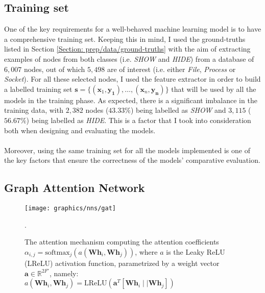 	\subsection{Training set} \label{Section: impl/ml/training-set}
	One of the key requirements for a well-behaved machine learning model is to have a comprehensive training set. Keeping this in mind, I used the ground-truths listed in Section \ref{Section: prep/data/ground-truths} with the aim of extracting examples of nodes from both classes (i.e. \textit{SHOW} and \textit{HIDE}) from a database of $6,007$ nodes, out of which $5,498$ are of interest (i.e. either \textit{File}, \textit{Process} or \textit{Socket}). For all these selected nodes, I used the feature extractor in order to build a labelled training set $\mathbf{s}=\{ (\mathbf{x}_1, \mathbf{y_1}), \dots, (\mathbf{x}_n, \mathbf{y_n}) \}$ that will be used by all the models in the training phase. As expected, there is a significant imbalance in the training data, with $2,382$ nodes ($43.33\%$) being labelled as \textit{SHOW} and $3,115$ ($56.67\%$) being labelled as \textit{HIDE}. This is a factor that I took into consideration both when designing and evaluating the models.
	\\ \\
	Moreover, using the same training set for all the models implemented is one of the key factors that ensure the correctness of the models' comparative evaluation. 
	\subsection{Graph Attention Network} \label{Section: impl/ml/gat}
	\begin{figure}[H]
		\centering
		\texttt{[image: graphics/nns/gat]}	
		\caption[Attention mechanism]{The attention mechanism computing the attention coefficients \\ $\alpha_{i,j}=\text{softmax}_j(a(\mathbf{Wh}_i, \mathbf{Wh}_j))$, where $a$ is the Leaky ReLU (LReLU) activation function, parametrized by a weight vector $\mathbf{a}\in\mathbb{R}^{2F'}$, namely: \\  $a(\mathbf{Wh}_i, \mathbf{Wh}_j)=\text{LReLU}(\mathbf{a}^T[\mathbf{Wh}_i\mid\mid\mathbf{Wh}_j])$}.
		\label{Fig: impl/attn-mechanism}
	\end{figure}
